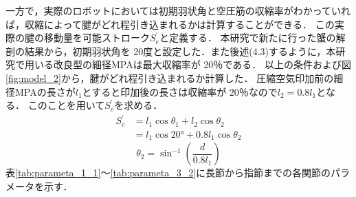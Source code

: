 一方で，実際のロボットにおいては初期羽状角と空圧筋の収縮率がわかっていれば，収縮によって腱がどれ程引き込まれるかは計算することができる．
この実際の腱の移動量を可能ストローク$S_{e}^{'}$と定義する．
本研究で新たに行った蟹の解剖の結果から，初期羽状角を 20度と設定した．また後述(4.3)するように，本研究で用いる改良型の細径MPAは最大収縮率が 20％である．
以上の条件および図\ref{fig:model_2}から，腱がどれ程引き込まれるか計算した．
圧縮空気印加前の細径MPAの長さが$l_1$とすると印加後の長さは収縮率が 20％なので$l_2 = 0.8l_1$となる．
このことを用いて$ S_{e}^{'}$を求める．
\begin{equation}
  \begin {split}
  S_{e}^{'}  & = l_1\cos\theta_1 + l_2\cos\theta_2\\
       & = l_1\cos20° + 0.8l_1\cos\theta_2
  \end{split}
\end{equation}
\begin{equation}
  \theta_2 = \sin^{-1}\left({\dfrac{d}{0.8 l_1}}\right)
\end{equation}
表\ref{tab:parameta_1_1}～\ref{tab:parameta_3_2}に長節から指節までの各関節のパラメータを示す．
